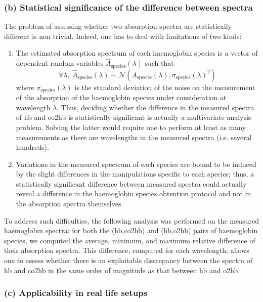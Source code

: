 \subsubsection*{(b) Statistical significance of the difference between spectra}

The problem of assessing whether two absorption spectra are statistically different is non trivial. Indeed, one has to deal with limitations of two kinds:
\begin{enumerate}
	\item The estimated absorption spectrum of each haemoglobin species is a vector of dependent random variables $\hat{A}_\text{species}(\lambda)$ such that
	\begin{equation}
		\forall \lambda,\ \hat{A}_\text{species}(\lambda) \sim \mathcal{N}\left(A_\text{species}(\lambda),\sigma_\text{species}(\lambda)^2\right)
	\end{equation}
	where $\sigma_\text{species}(\lambda)$ is the standard deviation of the noise on the measurement of the absorption of the haemoglobin species under consideration at wavelength $\lambda$. Thus, deciding whether the difference in the measured spectra of \gls{hb} and \gls{co2hb} is statistically significant is actually a multivariate analysis problem. Solving the latter would require one to perform at least as many measurements as there are wavelengths in the measured spectra (i.e. several hundreds)\cite{rencher2002}.
	\item Variations in the measured spectrum of each species are bound to be induced by the slight differences in the manipulations specific to each species; thus, a statistically significant difference between measured spectra could actually reveal a difference in the haemoglobin species obtention protocol and not in the absorption spectra themselves.
\end{enumerate}

To address such difficulties, the following analysis was performed on the measured haemoglobin spectra: for both the (\gls{hb},\gls{co2hb}) and (\gls{hb},\gls{o2hb}) pairs of haemoglobin species, we computed the average, minimum, and maximum relative difference of their absorption spectra. This difference, computed for each wavelength, allows one to assess whether there is an exploitable discrepancy between the spectra of \gls{hb} and \gls{co2hb} in the same order of magnitude as that between \gls{hb} and \gls{o2hb}.

\subsubsection*{(c) Applicability in real life setups}\label{sect:co2hb:pulse_carb_feas}

